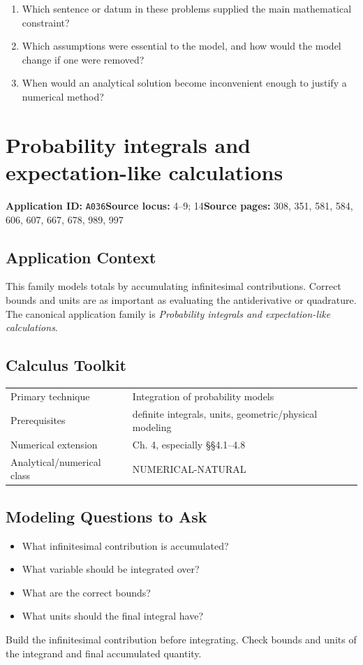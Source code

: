 \documentclass[11pt]{book}
\newcommand{\pid}[1]{\texttt{#1}}
\begin{document}
\begin{reflectionbox}\begin{enumerate}
\item Which sentence or datum in these problems supplied the main mathematical constraint?
\item Which assumptions were essential to the model, and how would the model change if one were removed?
\item When would an analytical solution become inconvenient enough to justify a numerical method?
\end{enumerate}\end{reflectionbox}
\chapter{Probability integrals and expectation-like calculations}\label{app:A036}
\textbf{Application ID:} \pid{A036}\quad \textbf{Source locus:} 4–9; 14\quad \textbf{Source pages:} 308, 351, 581, 584, 606, 607, 667, 678, 989, 997
\section*{Application Context}
This family models totals by accumulating infinitesimal contributions. Correct bounds and units are as important as evaluating the antiderivative or quadrature. The canonical application family is \emph{Probability integrals and expectation-like calculations}.
\section*{Calculus Toolkit}
\begin{tabularx}{\textwidth}{@{}lX@{}}\toprule
Primary technique & Integration of probability models \\
Prerequisites & definite integrals, units, geometric/physical modeling \\
Numerical extension & Ch. 4, especially §§4.1–4.8 \\
Analytical/numerical class & NUMERICAL-NATURAL \\
\bottomrule\end{tabularx}
\section*{Modeling Questions to Ask}\begin{itemize}
\item What infinitesimal contribution is accumulated?
\item What variable should be integrated over?
\item What are the correct bounds?
\item What units should the final integral have?
\end{itemize}
\begin{errorbox}Build the infinitesimal contribution before integrating. Check bounds and units of the integrand and final accumulated quantity.\end{errorbox}
\end{document}
